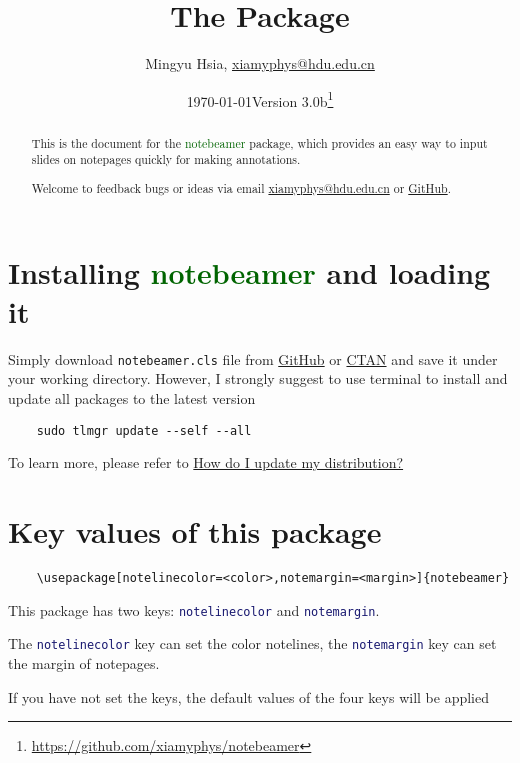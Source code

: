 \documentclass[11pt,svgnames]{article}
\title{\bfseries The \pkg{notebeamer} Package}
\author{Mingyu Hsia, \href{mailto:xiamyphys@hdu.edu.cn}{\ttfamily xiamyphys@hdu.edu.cn}}
\affil{Hangzhou Dianzi University}
\date{\today\quad Version 3.0b\thanks{\url{https://github.com/xiamyphys/notebeamer}}}
\def\pkg#1{\textcolor{DarkGreen}{\textsf{#1}}}
\def\cmd#1{\textcolor{MidnightBlue}{\texttt{\string#1}}}
\begin{document}
\maketitle

\begin{abstract}

This is the document for the \pkg{notebeamer} package, which provides an easy way to input slides on notepages quickly for making annotations.

Welcome to feedback bugs or ideas via email \href{mailto:xiamyphys@hdu.edu.cn}{\ttfamily xiamyphys@hdu.edu.cn} or \href{https://github.com/xiamyphys/notebeamer}{GitHub}.

\end{abstract}

\section{Installing \pkg{notebeamer} and loading it}

Simply download \verb|notebeamer.cls| file from \href{https://github.com/xiamyphys/notebeamer}{GitHub} or \href{https://ctan.org/pkg/notebeamer}{CTAN} and save it under your working directory. However, I strongly suggest to use terminal to install and update all packages to the latest version

\begin{verbatim}
    sudo tlmgr update --self --all
\end{verbatim}

To learn more, please refer to \href{https://tex.stackexchange.com/questions/55437/how-do-i-update-my-tex-distribution}{How do I update my  distribution?}

\section{Key values of this package}

\begin{verbatim}
    \usepackage[notelinecolor=<color>,notemargin=<margin>]{notebeamer}
\end{verbatim}

This package has two keys: \cmd{notelinecolor} and \cmd{notemargin}.

The \cmd{notelinecolor} key can set the color notelines, the \cmd{notemargin} key can set the margin of notepages.

If you have not set the keys, the default values of the four keys will be applied
\end{document}

